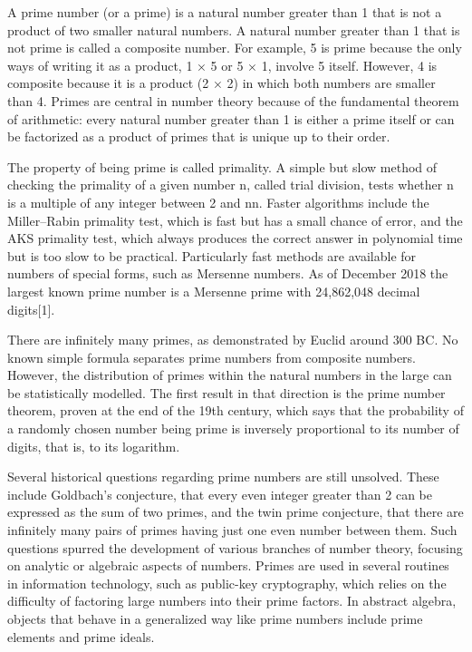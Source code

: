 A prime number (or a prime) is a natural number greater than 1 that is not a
product of two smaller natural numbers. A natural number greater than 1 that is
not prime is called a composite number. For example, 5 is prime because the only
ways of writing it as a product, 1 × 5 or 5 × 1, involve 5 itself. However, 4 is
composite because it is a product (2 × 2) in which both numbers are smaller than
4. Primes are central in number theory because of the fundamental theorem of
arithmetic: every natural number greater than 1 is either a prime itself or can
be factorized as a product of primes that is unique up to their order.

The property of being prime is called primality. A simple but slow method of
checking the primality of a given number n, called trial
division, tests whether n is a multiple of any integer between
2 and { { {n}}}{ {n}}. Faster algorithms include the
Miller–Rabin primality test, which is fast but has a small chance of error, and
the AKS primality test, which always produces the correct answer in polynomial
time but is too slow to be practical. Particularly fast methods are available
for numbers of special forms, such as Mersenne numbers. As of December 2018 the
largest known prime number is a Mersenne prime with 24,862,048 decimal
digits[1].

There are infinitely many primes, as demonstrated by Euclid around 300 BC. No
known simple formula separates prime numbers from composite numbers. However,
the distribution of primes within the natural numbers in the large can be
statistically modelled. The first result in that direction is the prime number
theorem, proven at the end of the 19th century, which says that the probability
of a randomly chosen number being prime is inversely proportional to its number
of digits, that is, to its logarithm.

Several historical questions regarding prime numbers are still unsolved. These
include Goldbach's conjecture, that every even integer greater than 2 can be
expressed as the sum of two primes, and the twin prime conjecture, that there
are infinitely many pairs of primes having just one even number between
them. Such questions spurred the development of various branches of number
theory, focusing on analytic or algebraic aspects of numbers. Primes are used in
several routines in information technology, such as public-key cryptography,
which relies on the difficulty of factoring large numbers into their prime
factors. In abstract algebra, objects that behave in a generalized way like
prime numbers include prime elements and prime ideals.

